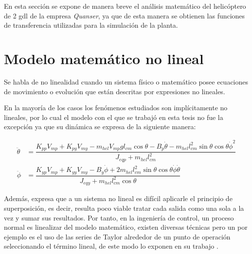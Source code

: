 \label{app:model math}

En esta sección se expone de manera breve el análisis matemático del helicóptero de 2 \gls{gdl} de la empresa \textit{Quanser}, ya que de esta manera se obtienen las funciones de transferencia utilizadas para la simulación de la planta.

\section{Modelo matemático no lineal}

Se habla de no linealidad cuando un sistema físico o matemático posee ecuaciones de movimiento o evolución que están descritas por expresiones no lineales.

En la mayoría de los casos los fenómenos estudiados son implícitamente no lineales, por lo cual el modelo con el que se trabajó en esta tesis no fue la excepción ya que su dinámica se expresa de la siguiente manera:

\begin{align}
   \label{equa:ddot-theta2}
   \ddot{\theta} &= \dfrac{K_{pp}V_{mp}+K_{py}V_{my}-m_{hel}V_{mp}gl_{cm}\cos\theta - B_p\dot{\theta}- m_{hel}l_{cm}^2\sin\theta\cos\theta\dot{\phi}^2} {J_{eqp}+m_{hel}l_{cm}^2} \\
   \label{equa:ddot-phi2}
   \ddot{\phi} &= \dfrac{K_{yp}V_{mp}+K_{yy}V_{my}-B_y\dot{\phi}+2m_{hel}l_{cm}^2\sin\theta\cos\theta\dot{\phi}\dot{\theta}} {J_{eqy}+m_{hel}l_{cm}^2\cos\theta}
\end{align}

Además, \citet[pp. 42-43]{Ogata2010} expresa que a un sistema no lineal es difícil aplicarle el principio de superposición, es decir, resulta poco viable tratar cada salida como una sola a la vez y sumar sus resultados. Por tanto, en la ingeniería de control, un proceso normal es linealizar del modelo matemático, existen diversas técnicas pero un por ejemplo es el uso de las series de Taylor alrededor de un punto de operación seleccionando el término lineal, de este modo lo exponen en su trabajo \citet{VillarealGrajales2017}.
